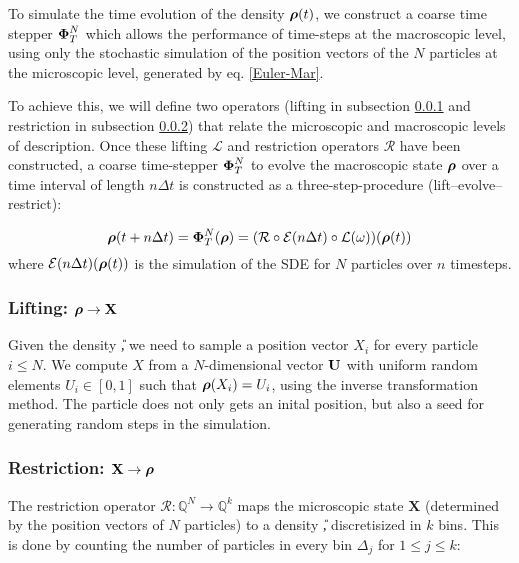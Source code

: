 

To simulate the time evolution of  the density $\boldsymbol{\rho}(t)$, we construct  a coarse time stepper $\boldsymbol{\Phi}^N_T$ which allows the performance of time-steps at the macroscopic level, using only the stochastic simulation of the position vectors of the $N$ particles at the microscopic level, %
generated by eq. \eqref{Euler-Mar}. 

To achieve this, we will define two operators (lifting in subsection \ref{section:lifting} and
restriction in subsection \ref{section:restriction}) that relate the microscopic and macroscopic levels of description.
Once these lifting $\mathcal{L}$ and restriction  operators $\mathcal{R}$ have been constructed, a coarse time-stepper $\boldsymbol{\Phi}^N_T$ 
to evolve the macroscopic state $\boldsymbol{\rho}$ over a time interval of length $n \Delta t$ is constructed as a three-step-procedure (lift–evolve–restrict):

\begin{equation}
\boldsymbol{\rho}(t + n \Delta t) = \boldsymbol{\Phi}^N_T(\boldsymbol{\rho}) = (\mathcal{R} \circ \mathcal{E}(n \Delta t) \circ  \mathcal{L}(\mathbf{\omega})  ) (\boldsymbol{\rho}(t))
\end{equation}
where $\mathcal{E}(n \Delta t)(\boldsymbol{\rho}(t))$ is the simulation of the SDE for $N$ particles over $n$ timesteps.


\subsubsection{Lifting: $\boldsymbol{\rho} \rightarrow \mathbf{X} $} \label{section:lifting}
Given the density \U, we need to sample a position vector $X_i$ for every particle $i \leq N$. We compute $X$ from a $N$-dimensional vector $\bf{U}$  with uniform random elements $U_i \in [0,1]$ such that $\boldsymbol{\rho}(X_i)=U_i$, using the inverse transformation method. The particle does not only gets an inital position, but also a seed for generating random steps in the simulation.

\subsubsection{Restriction:  $\mathbf{X} \rightarrow \boldsymbol{\rho} $}
\label{section:restriction}
The restriction operator $\mathcal{R}: \mathbb{Q}^N \rightarrow \mathbb{Q}^k$ maps the microscopic state $\mathbf{X}$ (determined by the position vectors of $N$ particles) to a density \U, discretisized in $k$ bins. This is done by counting the number of particles in every bin $\Delta_j$ for $1\leq j \leq k$: %

